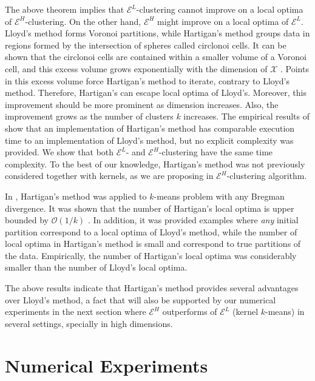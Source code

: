 \documentclass[aps,preprint,nofootinbib,floatfix]{revtex4-1}
\begin{document}
The above theorem implies that $\mathcal{E}^L$-clustering  cannot
improve on a local optima of $\mathcal{E}^H$-clustering. On the other hand,
$\mathcal{E}^H$ might improve on a local optima of 
$\mathcal{E}^L$. Lloyd's method forms Voronoi partitions,
while Hartigan's method groups data
in regions formed by the intersection of spheres called circlonoi cells.
It can be shown that the circlonoi cells are contained within
a smaller volume of a Voronoi cell, and this excess volume grows
exponentially with the dimension of $\mathcal{X}$ 
\cite[Theorems 2.4 and 3.1]{Telgarsky}. 
Points in this excess volume
force Hartigan's method to iterate, contrary
to Lloyd's method. Therefore, Hartigan's 
can escape local
optima of Lloyd's. 
Moreover, this improvement should be more prominent as
dimension increases. Also, the improvement grows as the number of clusters
$k$ increases.
The empirical results of \cite{Telgarsky} show that 
an implementation of Hartigan's method has comparable execution time 
to an implementation of
Lloyd's method,
but no explicit complexity was provided. We show that both
$\mathcal{E}^L$- and $\mathcal{E}^H$-clustering
have the same time complexity. To the best of our knowledge, Hartigan's
method was not previously considered together with kernels, as we 
are proposing
in $\mathcal{E}^{H}$-clustering algorithm.

In \cite{Slonin}, Hartigan's method was applied to $k$-means problem
with any Bregman divergence. It was shown that the number of Hartigan's
local optima is upper bounded by $\mathcal{O}(1/k)$ 
\cite[Proposition 5.1]{Slonin}. 
In addition, it was provided examples where
\emph{any} initial partition correspond to a local optima of Lloyd's 
method, while  the number of local optima in Hartigan's method is small and 
correspond to true partitions of the data. Empirically, the number of
Hartigan's local optima was considerably smaller than the number of Lloyd's
local optima.

The above results indicate that Hartigan's method
provides several advantages over Lloyd's method, a fact that will also
be supported by our numerical experiments in the next section where 
$\mathcal{E}^H$  outperforms
of $\mathcal{E}^L$ (kernel $k$-means) in several settings,
specially in high dimensions.


\section{Numerical Experiments}
\label{sec:numerics}
\end{document}
